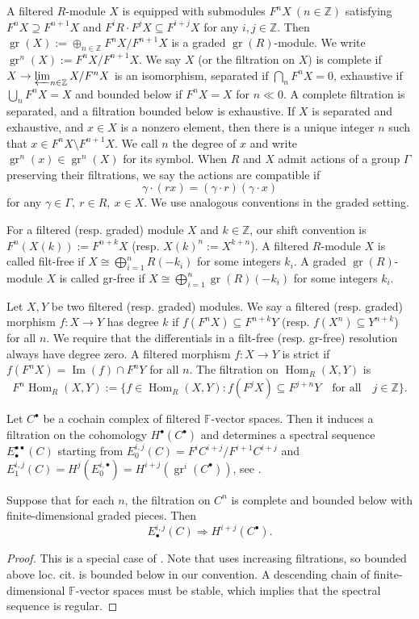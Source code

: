 \documentclass[11pt,a4paper]{article} %
\def\FF{\mathbb{F}}
\def\ZZ{\mathbb{Z}}
\def\gr{\operatorname{gr}}
\def\Hom{\operatorname{Hom}}
\def\Im{\operatorname{Im}}
\begin{document}
A filtered $R$-module $X$ is equipped with submodules $F^nX~(n\in\ZZ)$ satisfying $F^nX\supseteq F^{n+1}X$ and $F^iR\cdot F^jX\subseteq F^{i+j}X$ for any $i,j\in\mathbb{Z}$. Then $\gr(X):=\oplus_{n\in\ZZ}F^nX/F^{n+1}X$ is a graded $\gr(R)$-module. We write $\gr^n(X):=F^nX/F^{n+1}X$.
We say $X$ (or the filtration on $X$) is complete if $X\to\varprojlim_{n\in\ZZ} X/F^nX$ is an isomorphism, separated if $\bigcap_nF^nX=0$, exhaustive if $\bigcup_nF^nX=X$ and bounded below if $F^nX=X$ for $n\ll0$. A complete filtration is separated, and a filtration bounded below is exhaustive. If $X$ is separated and exhaustive, and $x\in X$ is a nonzero element, then there is a unique integer $n$ such that $x\in F^nX\setminus F^{n+1}X$. We call $n$ the degree of $x$ and write $\gr^n(x)\in\gr^n(X)$ for its symbol. When $R$ and $X$ admit actions of a group $\Gamma$ preserving their filtrations, we say the actions are compatible if 
\[
\gamma\cdot(rx)=(\gamma\cdot r)(\gamma\cdot x)
\]
for any $\gamma\in\Gamma,~r\in R,~x\in X$. We use analogous conventions in the graded setting.

For a filtered (resp. graded) module $X$ and $k\in\ZZ$, our shift convention is $F^n(X(k)):=F^{n+k}X$ (resp. $X(k)^n:=X^{k+n}$). A filtered $R$-module $X$ is called filt-free if $X\cong\bigoplus_{i=1}^nR(-k_i)$ for some integers $k_i$. A graded $\gr(R)$-module $X$ is called gr-free if $X\cong\bigoplus_{i=1}^n\gr(R)(-k_i)$ for some integers $k_i$. 

Let $X,Y$ be two filtered (resp. graded) modules. We say a filtered (resp. graded) morphism $f:X\to Y$ has degree $k$ if $f(F^nX)\subseteq F^{n+k}Y$ (resp. $f(X^n)\subseteq Y^{n+k}$) for all $n$. We require that the differentials in a filt-free (resp. gr-free) resolution always have degree zero. A filtered morphism $f:X\to Y$ is strict if $f(F^nX)=\Im(f)\cap F^nY$ for all $n$. The filtration on $\Hom_R(X,Y)$ is
\[
F^n\Hom_R(X,Y):=\{f\in\Hom_R(X,Y):f(F^jX)\subseteq F^{j+n}Y \quad\text{for all}\quad j\in\ZZ\}.
\]

Let $C^\bullet$ be a cochain complex of filtered $\FF$-vector spaces. Then it induces a filtration on the cohomology $H^\bullet(C^\bullet)$ and determines a spectral sequence $E_\bullet^{\bullet\bullet}(C)$ starting from $E_0^{i,j}(C)=F^iC^{i+j}/F^{i+1}C^{i+j}$ and $E_1^{i,j}(C)=H^{j}(E_0^{i,\bullet})=H^{i+j}\left(\gr^i(C^\bullet)\right)$, see \cite[\S 5.4]{WC}.

\begin{proposition}\label{prop:spectral-sequence}
    Suppose that for each $n$, the filtration on $C^n$ is complete and bounded below with finite-dimensional graded pieces. Then
    \[
    E_\bullet^{i,j}(C)\Longrightarrow H^{i+j}(C^{\bullet}).
    \]
\end{proposition}
\begin{proof}
    This is a special case of \cite[Theorem 5.5.10 (2)]{WC}. Note that \cite{WC} uses increasing filtrations, so bounded above loc. cit. is bounded below in our convention. A descending chain of finite-dimensional $\FF$-vector spaces must be stable, which implies that the spectral sequence is regular.
\end{proof}
\end{document}
